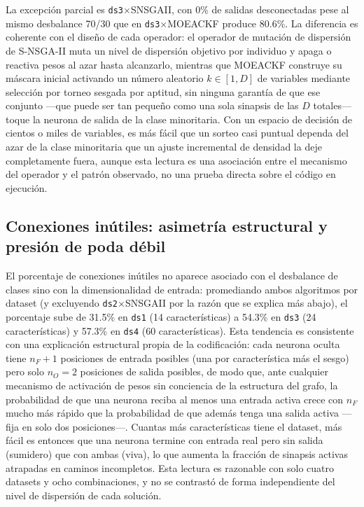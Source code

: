 La excepción parcial es \texttt{ds3}$\times$SNSGAII, con 0\% de salidas desconectadas pese al mismo desbalance 70/30 que en \texttt{ds3}$\times$MOEACKF produce 80.6\%. La diferencia es coherente con el diseño de cada operador: el operador de mutación de dispersión de S-NSGA-II muta un nivel de dispersión objetivo por individuo y apaga o reactiva pesos al azar hasta alcanzarlo, mientras que MOEACKF construye su máscara inicial activando un número aleatorio $k \in [1, D]$ de variables mediante selección por torneo sesgada por aptitud, sin ninguna garantía de que ese conjunto —que puede ser tan pequeño como una sola sinapsis de las $D$ totales— toque la neurona de salida de la clase minoritaria. Con un espacio de decisión de cientos o miles de variables, es más fácil que un sorteo casi puntual dependa del azar de la clase minoritaria que un ajuste incremental de densidad la deje completamente fuera, aunque esta lectura es una asociación entre el mecanismo del operador y el patrón observado, no una prueba directa sobre el código en ejecución.

\subsection{Conexiones inútiles: asimetría estructural y presión de poda débil}

El porcentaje de conexiones inútiles no aparece asociado con el desbalance de clases sino con la dimensionalidad de entrada: promediando ambos algoritmos por dataset (y excluyendo \texttt{ds2}$\times$SNSGAII por la razón que se explica más abajo), el porcentaje sube de 31.5\% en \texttt{ds1} (14 características) a 54.3\% en \texttt{ds3} (24 características) y 57.3\% en \texttt{ds4} (60 características). Esta tendencia es consistente con una explicación estructural propia de la codificación: cada neurona oculta tiene $n_F+1$ posiciones de entrada posibles (una por característica más el sesgo) pero solo $n_O=2$ posiciones de salida posibles, de modo que, ante cualquier mecanismo de activación de pesos sin conciencia de la estructura del grafo, la probabilidad de que una neurona reciba al menos una entrada activa crece con $n_F$ mucho más rápido que la probabilidad de que además tenga una salida activa —fija en solo dos posiciones—. Cuantas más características tiene el dataset, más fácil es entonces que una neurona termine con entrada real pero sin salida (sumidero) que con ambas (viva), lo que aumenta la fracción de sinapsis activas atrapadas en caminos incompletos. Esta lectura es razonable con solo cuatro datasets y ocho combinaciones, y no se contrastó de forma independiente del nivel de dispersión de cada solución.

